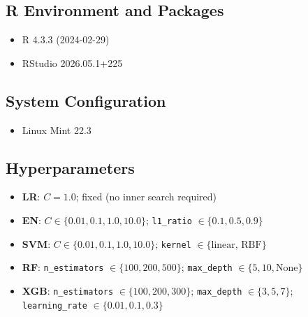 \subsection*{R Environment and Packages}
\begin{itemize}
    \item R 4.3.3 (2024-02-29)
    \item RStudio 2026.05.1+225
\end{itemize}

\subsection*{System Configuration}
\begin{itemize}
    \item Linux Mint 22.3
\end{itemize}

\subsection*{Hyperparameters}
\label{app:hyperparam}
\begin{itemize}
    \item \textbf{LR}: $C = 1.0$; fixed (no inner search required)
    \item \textbf{EN}: $C \in \{0.01, 0.1, 1.0, 10.0\}$; \texttt{l1\_ratio} $\in \{0.1, 0.5, 0.9\}$
    \item \textbf{SVM}: $C \in \{0.01, 0.1, 1.0, 10.0\}$; \texttt{kernel} $\in \{\text{linear, RBF}\}$
    \item \textbf{RF}: \texttt{n\_estimators} $\in \{100, 200, 500\}$; \texttt{max\_depth} $\in \{5, 10, \text{None}\}$
    \item \textbf{XGB}: \texttt{n\_estimators} $\in \{100, 200, 300\}$; \texttt{max\_depth} $\in \{3, 5, 7\}$; \texttt{learning\_rate} $\in \{0.01, 0.1, 0.3\}$
\end{itemize}